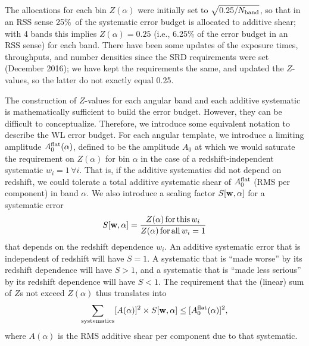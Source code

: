 \documentclass[aps,prd, amsmath,amssymb,superscriptaddress,showkeys,nofootinbib,reprint,preprintnumbers]{revtex4-1}
\begin{document}
\begin{widetext}
The allocations for each bin $Z(\alpha)$ were initially set to $\sqrt{0.25/N_{\rm band}}$, so that in an RSS sense 25\%\ of the systematic error budget is allocated to additive shear; with 4 bands this implies $Z(\alpha)=0.25$ (i.e., 6.25\% of the error budget in an RSS sense) for each band. There have been some updates of the exposure times, throughputs, and number densities since the SRD requirements were set (December 2016); we have kept the requirements the same, and updated the $Z$-values, so the latter do not exactly equal 0.25.

The construction of $Z$-values for each angular band and each additive
systematic is mathematically sufficient to build the error
budget. However, they can be difficult to conceptualize. Therefore, we
introduce some equivalent notation to describe the WL error
budget. For each angular template, we introduce a limiting amplitude
$A_0^{\rm flat}(\alpha)$, defined to be the amplitude $A_0$ at which
we would saturate the requirement on $Z(\alpha)$ for bin $\alpha$ in
the case of a redshift-independent systematic $w_i=1\,\forall i$. That
is, if the additive systematics did not depend on redshift, we could
tolerate a total additive systematic shear of $A_0^{\rm flat}$ (RMS
per component) in band $\alpha$. We also introduce a scaling factor
$S[{\bf w},\alpha]$ for a systematic error
\begin{equation}
S[{\bf w},\alpha] = \frac{Z(\alpha) \,{\rm for\,this\,}w_i}{Z(\alpha)\,{\rm for\,all\,}w_i=1}
\label{eq:Swa}
\end{equation}
that depends on the redshift dependence $w_i$. An additive systematic error that is independent of redshift will have $S=1$. A systematic that is ``made worse'' by its redshift dependence will have $S>1$, and a systematic that is ``made less serious'' by its redshift dependence will have $S<1$. The requirement that the (linear) sum of $Z$s not exceed $Z(\alpha)$ thus translates into
\begin{equation}
\sum_{\rm systematics} [A(\alpha)]^2\times S[{\bf w},\alpha] \le [A_0^{\rm flat}(\alpha)]^2,
\label{eq:A-S-sum}
\end{equation}
where $A(\alpha)$ is the RMS additive shear per component due to that systematic.


\end{widetext}
\end{document}
